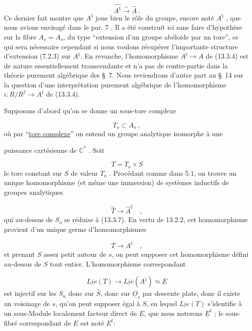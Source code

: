 \begin{equation}\tag{13.3.6}
\widehat{A^\natural} \stackrel{\sim}{\longrightarrow} \hat{A} \ .
\end{equation}
Ce dernier fait montre que $A^\natural$ joue bien le rôle du groupe, encore noté $A^\natural$ , que nous avions envisagé dans le par. 7 . Il a été construit ici sans faire d'hypothèse sur la fibre $A_s = A_o$, du type ``extension d'un groupe abéloide par un tore'', ce qui sera nécessaire cependant si nous voulons récupérer l'importante structure d'extension (7.2.3) sur $A^\natural$. En revanche, l'homomorphisme $A^\natural \longrightarrow A$ de (13.3.4) est de nature essentiellement transcendante et n'a pas de contre-partie dans la théorie purement algébrique des \S~7. Nous reviendrons d'autre part au \S~14 sur la question d'une interprétation purement algébrique de l'homomorphisme $i : R/R^f \longrightarrow A^\natural$ de (13.3.4).

Supposons d'abord qu'on se donne un sous-tore complexe

\begin{equation}\tag{13.3.7}
T_o \subset A_o \ ,
\end{equation}
où par ``\underline{tore complexe}'' on entend un groupe analytique isomorphe à une



puissance cartésienne de $\mathbb{C}^*$ . Soit

\begin{equation}\tag{13.3.8}
T = T_o \times S
\end{equation}
le tore constant sur $S$ de valeur $T_o$ . Procédant comme dans 5.1, on trouve un unique homomorphisme (et même une immersion) de systèmes inductifs de groupes analytiques

\begin{equation*}
\hat{T} \longrightarrow \hat{A}^{\natural} \quad ,
\end{equation*}
qui au-dessus de $S_o$ se réduise à (13.3.7). En vertu de 13.2.2, cet homomorphisme provient d'un unique germe d'homomorphismes

\begin{equation}\tag{13.3.9}
T \longrightarrow A^{\natural} \quad ,
\end{equation}
et prenant $S$ assez petit autour de $s$, on peut supposer cet homomorphisme défini au-dessus de $S$ tout entier. L'homomorphisme correspondant

\begin{equation*}
\underline{Lie}(T) \longrightarrow \underline{Lie}(A^{\natural}) \simeq E
\end{equation*}
est injectif sur les $S_n$ donc sur $\hat{S}$, donc sur $\underline{O}_s$ par descente plate, donc il existe un voisinage de $s$, qu'on peut supposer égal à $S$, en lequel $\underline{Lie}(T)$ s'identifie à un sous-Module localement facteur direct de $\underline{E}$, que nous noterons $\underline{E}^t$ ; le sous-fibré correspondant de $E$ est noté $E^t$:


